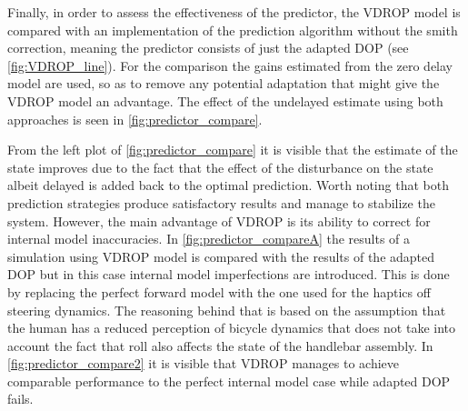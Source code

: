 Finally, in order to assess the effectiveness of the predictor, the VDROP model is compared with an implementation of the prediction algorithm without the smith correction, meaning the predictor consists of just the adapted DOP (see \cref{fig:VDROP_line}). For the comparison the gains estimated from the zero delay model are used, so as to remove any potential adaptation that might give the VDROP model an advantage. The effect of the undelayed estimate using both approaches is seen in \cref{fig:predictor_compare}.


From the left plot of \cref{fig:predictor_compare} it is visible that the estimate of the state  improves due to the fact that the effect of the disturbance on the state albeit delayed is added back to the optimal prediction. Worth noting that both prediction strategies produce satisfactory results and manage to stabilize the system. However, the main advantage of  VDROP is its ability to correct for internal model inaccuracies. In \cref{fig:predictor_compareA} the results of a simulation using VDROP  model is compared with the results of the adapted DOP  but in this case internal model imperfections are introduced. This is done by replacing the perfect forward model with  the one used for the haptics off steering dynamics. The reasoning behind that is based on the assumption that the human has a reduced perception of bicycle dynamics that does not take into account the fact that roll also affects the state of the handlebar assembly.  In \cref{fig:predictor_compare2} it is visible that VDROP manages to achieve comparable performance to the perfect internal model case while adapted DOP fails. 

